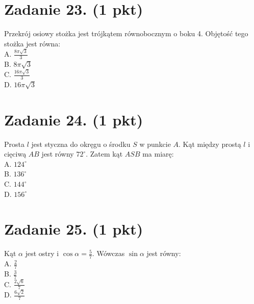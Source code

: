 \documentclass[10pt]{article}
\begin{document}
\section*{Zadanie 23. (1 pkt)}
Przekrój osiowy stożka jest trójkątem równobocznym o boku 4. Objętość tego stożka jest równa:\\
A. \(\frac{8 \pi \sqrt{3}}{3}\)\\
B. \(8 \pi \sqrt{3}\)\\
C. \(\frac{16 \pi \sqrt{3}}{3}\)\\
D. \(16 \pi \sqrt{3}\)

\section*{Zadanie 24. (1 pkt)}
Prosta \(l\) jest styczna do okręgu o środku \(S\) w punkcie \(A\). Kąt między prostą \(l\) i cięciwą \(A B\) jest równy \(72^{\circ}\). Zatem kąt \(A S B\) ma miarę:\\
A. \(124^{\circ}\)\\
B. \(136^{\circ}\)\\
C. \(144^{\circ}\)\\
D. \(156^{\circ}\)

\section*{Zadanie 25. (1 pkt)}
Kąt \(\alpha\) jest ostry i \(\cos \alpha=\frac{5}{7}\). Wówczas \(\sin \alpha\) jest równy:\\
A. \(\frac{2}{7}\)\\
B. \(\frac{3}{7}\)\\
C. \(\frac{2 \sqrt{6}}{7}\)\\
D. \(\frac{6 \sqrt{2}}{7}\)
\end{document}
